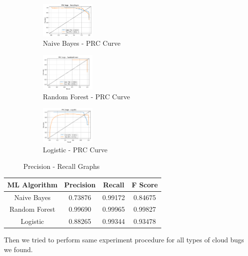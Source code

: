 \documentclass{seal_article}
\begin{document}
\vspace{0.5cm}
\begin{figure}[h] 
\centering
\captionsetup{justification=centering}
\begin{subfigure}{.3\linewidth}
  \centering
  \includegraphics[width=2.7cm]{img/naive_cloud_specific.PNG}
  \caption{Naive Bayes - PRC Curve}
  \label{fig:sub1}
\end{subfigure}
\begin{subfigure}{.3\linewidth}
  \centering
  \includegraphics[width=2.7cm]{img/random_forest_cloud_specific.PNG}
  \caption{Random Forest - PRC Curve}
  \label{fig:sub1}
\end{subfigure}
\begin{subfigure}{.3\linewidth}
  \centering
  \includegraphics[width=2.7cm]{img/logistic_cloud_speicific.PNG}
  \caption{Logistic - PRC Curve}
  \label{fig:sub2}
\end{subfigure}
\caption{Precision - Recall Graphs}
\label{fig.aug}
\end{figure} 
\begin{center}
 \begin{tabular}{||c c c c||} 
 \hline
 ML Algorithm &Precision & Recall & F Score   \\ [0.5ex] 
 \hline\hline
  Naive Bayes & 0.73876 & 0.99172 & 0.84675\\ 
 \hline
 Random Forest & 0.99690 & 0.99965 & 0.99827 \\
 \hline
 Logistic & 0.88265 & 0.99344 & 0.93478 \\
 \hline
\end{tabular}

\end{center}
\vspace{0.5cm}

Then we tried to perform same experiment procedure for all types of cloud bugs we found.
\end{document}
